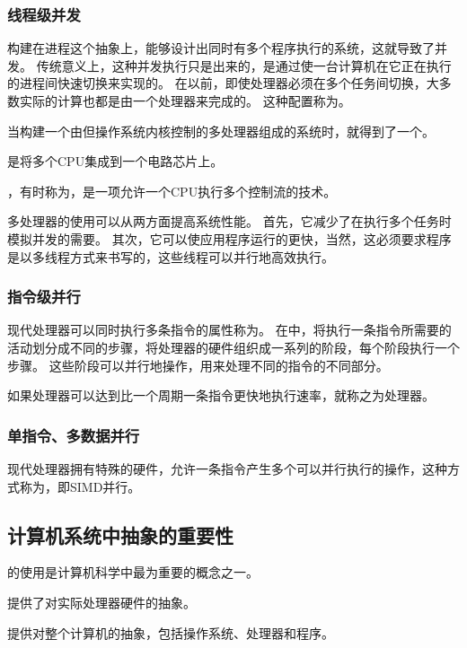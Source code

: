 {{        \subsubsection{线程级并发}
        {
            构建在进程这个抽象上，能够设计出同时有多个程序执行的系统，这就导致了并发。
            传统意义上，这种并发执行只是出来的，是通过使一台计算机在它正在执行的进程间快速切换来实现的。
            在以前，即使处理器必须在多个任务间切换，大多数实际的计算也都是由一个处理器来完成的。
            这种配置称为。

            当构建一个由但操作系统内核控制的多处理器组成的系统时，就得到了一个。

            是将多个CPU集成到一个电路芯片上。

            ，有时称为，是一项允许一个CPU执行多个控制流的技术。

            多处理器的使用可以从两方面提高系统性能。
            首先，它减少了在执行多个任务时模拟并发的需要。
            其次，它可以使应用程序运行的更快，当然，这必须要求程序是以多线程方式来书写的，这些线程可以并行地高效执行。
        }

        \subsubsection{指令级并行}
        {
            现代处理器可以同时执行多条指令的属性称为。
            在中，将执行一条指令所需要的活动划分成不同的步骤，将处理器的硬件组织成一系列的阶段，每个阶段执行一个步骤。
            这些阶段可以并行地操作，用来处理不同的指令的不同部分。

            如果处理器可以达到比一个周期一条指令更快地执行速率，就称之为处理器。
        }

        \subsubsection{单指令、多数据并行}
        {
            现代处理器拥有特殊的硬件，允许一条指令产生多个可以并行执行的操作，这种方式称为，即SIMD并行。
        }
    }

    \subsection{计算机系统中抽象的重要性}
    {
        的使用是计算机科学中最为重要的概念之一。

        提供了对实际处理器硬件的抽象。

        提供对整个计算机的抽象，包括操作系统、处理器和程序。
    }
}
